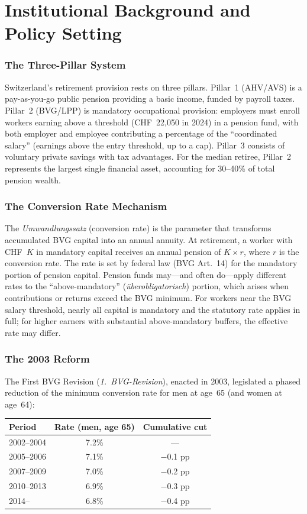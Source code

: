 \documentclass[12pt]{article}
\begin{document}
\section{Institutional Background and Policy Setting}
\label{sec:background}

\subsubsection*{The Three-Pillar System} Switzerland's retirement provision rests on three pillars. Pillar~1 (AHV/AVS) is a pay-as-you-go public pension providing a basic income, funded by payroll taxes. Pillar~2 (BVG/LPP) is mandatory occupational provision: employers must enroll workers earning above a threshold (CHF~22,050 in 2024) in a pension fund, with both employer and employee contributing a percentage of the ``coordinated salary'' (earnings above the entry threshold, up to a cap). Pillar~3 consists of voluntary private savings with tax advantages. For the median retiree, Pillar~2 represents the largest single financial asset, accounting for 30--40\% of total pension wealth.

\subsubsection*{The Conversion Rate Mechanism} The \textit{Umwandlungssatz} (conversion rate) is the parameter that transforms accumulated BVG capital into an annual annuity. At retirement, a worker with CHF~$K$ in mandatory capital receives an annual pension of $K \times r$, where $r$ is the conversion rate. The rate is set by federal law (BVG Art.~14) for the mandatory portion of pension capital. Pension funds may---and often do---apply different rates to the ``above-mandatory'' (\textit{überobligatorisch}) portion, which arises when contributions or returns exceed the BVG minimum. For workers near the BVG salary threshold, nearly all capital is mandatory and the statutory rate applies in full; for higher earners with substantial above-mandatory buffers, the effective rate may differ.

\subsubsection*{The 2003 Reform} The First BVG Revision (\textit{1.~BVG-Revision}), enacted in 2003, legislated a phased reduction of the minimum conversion rate for men at age~65 (and women at age~64):

\begin{center}
\begin{tabular}{lcc}
\toprule
Period & Rate (men, age 65) & Cumulative cut \\
\midrule
2002--2004 & 7.2\% & --- \\
2005--2006 & 7.1\% & $-$0.1 pp \\
2007--2009 & 7.0\% & $-$0.2 pp \\
2010--2013 & 6.9\% & $-$0.3 pp \\
2014-- & 6.8\% & $-$0.4 pp \\
\bottomrule
\end{tabular}
\end{center}
\end{document}
